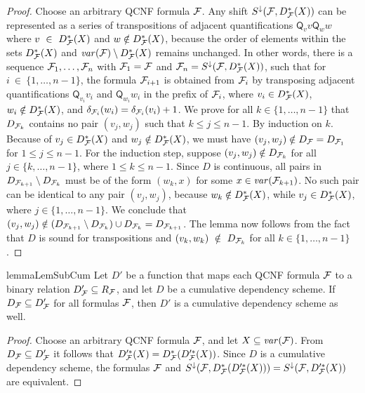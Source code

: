 \documentclass{llncs}
\newcommand{\longversion}[1]{#1}
\newcommand{\shortversion}[1]{}
\begin{document}
\longversion{\shortversion{\begin{sloppypar}}
\begin{proof} Choose an arbitrary QCNF formula $\mathcal{F}$. Any shift
  $S^{\downarrow}(\mathcal{F},D^*_{\mathcal{F}}(X))$ can be represented as a series of
  transpositions of adjacent quantifications $\mathsf{Q}_v v\mathsf{Q}_w w$
  where $v~\in~D^*_{\mathcal{F}}(X)$ and $w \notin D^*_{\mathcal{F}}(X)$, because the order
  of elements within the sets $D^*_{\mathcal{F}}(X)$ and $\mathit{var}(\mathcal{F}) \setminus
  D^*_{\mathcal{F}}(X)$ remains unchanged. In other words, there is a sequence
  $\mathcal{F}_1,\dots, \mathcal{F}_n$ with $\mathcal{F}_1 = \mathcal{F}$ and $\mathcal{F}_n =
  S^{\downarrow}(\mathcal{F},D^*_{\mathcal{F}}(X))$, such that for $i~\in~\{1, \dots,
  n-1\}$, the formula $\mathcal{F}_{i+1}$ is obtained from $\mathcal{F}_{i}$ by transposing
  adjacent quantifications $\mathsf{Q}_{v_i} v_i$ and $\mathsf{Q}_{w_i} w_i$
  in the prefix of $\mathcal{F}_{i}$, where $v_i \in D^*_{\mathcal{F}}(X)$, $w_i \notin
  D^*_{\mathcal{F}}(X)$, and $\delta_{\mathcal{F}_i}(w_i) = \delta_{\mathcal{F}_i}(v_i) + 1$. We
  prove for all $k \in \{1,\dots,n-1\}$ that $D_{\mathcal{F}_k}$ contains no pair
  $(v_j,w_j)$ such that $k \leq j \leq n -1$. By induction on $k$. Because of
  $v_j \in D^*_{\mathcal{F}}(X)$ and $w_j \notin D^*_{\mathcal{F}}(X)$, we must have $(v_j,
  w_j) \notin D_{\mathcal{F}} = D_{\mathcal{F}_1}$ for $1 \leq j \leq n - 1$. For the
  induction step, suppose $(v_j,w_j) \notin D_{\mathcal{F}_k}$ for all $j \in
  \{k,\dots,n-1\}$, where $1 \leq k \leq n-1$. Since $D$ is continuous, all
  pairs in $D_{\mathcal{F}_{k+1}} \setminus D_{\mathcal{F}_k}$ must be of the form $(w_k,
  x)$ for some $x \in \mathit{var}(\mathcal{F}_{k+1})$. No such pair can be identical to any
  pair $(v_j, w_j)$, because $w_k \notin D^*_{\mathcal{F}}(X)$, while $v_j \in
  D^*_{\mathcal{F}}(X)$, where $j \in \{1,\dots, n-1\}$. We conclude that $(v_j,w_j)
  \notin (D_{\mathcal{F}_{k+1}} \setminus D_{\mathcal{F}_{k}}) \cup D_{\mathcal{F}_k} =
  D_{\mathcal{F}_{k+1}}$.  The lemma now follows from the fact that $D$ is sound for
  transpositions and $(v_k,w_k)~\notin~D_{\mathcal{F}_k}$ for all $k \in \{1,\dots,
  n-1\}$.
\end{proof}
\shortversion{\end{sloppypar}}
 }
\begin{restatable}{lemma}{LemSubCum} \label{lem:subcum}\shortversion{\textup{($\star$)}}
  Let $D'$ be a function that maps each QCNF formula $\mathcal{F}$ to a binary
  relation $D'_{\mathcal{F}} \subseteq R_{\mathcal{F}}$, and let $D$ be a cumulative
  dependency scheme. If $D_{\mathcal{F}} \subseteq D'_{\mathcal{F}}$ for all formulas
  $\mathcal{F}$, then $D'$ is a cumulative dependency scheme as well.
\end{restatable}
\longversion{ \longversion{\begin{sloppypar}}
\begin{proof}
  Choose an arbitrary QCNF formula $\mathcal{F}$, and let $X \subseteq
  \mathit{var}(\mathcal{F})$. From $D_{\mathcal{F}}\subseteq D'_{\mathcal{F}}$ it follows that
  $D'^*_{\mathcal{F}}(X) = D^*_{\mathcal{F}}(D'^*_{\mathcal{F}}(X))$. Since $D$ is a cumulative
  dependency scheme, the formulas $\mathcal{F}$ and $S^\downarrow(\mathcal{F},
  D^*_{\mathcal{F}}(D'^*_{\mathcal{F}}(X))) = S^\downarrow(\mathcal{F}, D'^*_{\mathcal{F}}(X))$ are
  equivalent.
\end{proof}
\longversion{\end{sloppypar}}
 }
\end{document}
